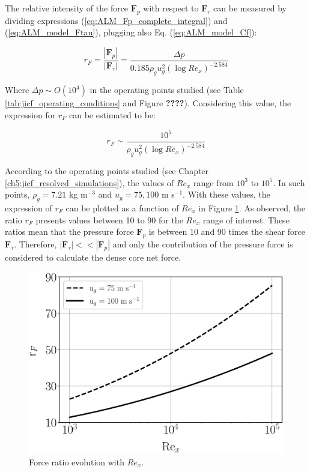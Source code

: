 The relative intensity of the force $\boldsymbol{F}_p$ with respect to $\boldsymbol{F}_\tau$ can be measured by dividing expressions (\ref{eq:ALM_Fp_complete_integral}) and (\ref{eq:ALM_model_Ftau}), plugging also Eq. (\ref{eq:ALM_model_Cf}):

\begin{equation}
\label{eq:rF_definition}
r_F = \frac{| \boldsymbol{F}_p| }{| \boldsymbol{F}_\tau |} = \frac{\Delta p}{0.185 \rho_g u_g^2 \left( \log Re_x \right)^{-2.584}}
\end{equation}


Where $\Delta p \sim O \left( 10^4 \right) $ in the operating points studied (see Table \ref{tab:jicf_operating_conditions} and Figure \textbf{????}). Considering this value, the expression for $r_F$ can be estimated to be:

\begin{equation}
r_F \sim \frac{10^5}{\rho_g u_g^2 \left( \log Re_x \right)^{-2.584}}
\end{equation}

According to the operating points studied (see Chapter \ref{ch5:jicf_resolved_simulations}), the values of $Re_x$ range from $10^3$ to $10^5$. In such points, $\rho_g = 7.21$ kg m$^{-3}$ and $u_g = 75, 100$ m s$^{-1}$. With these values, the expression of $r_F$ can be plotted as a function of $Re_x$ in Figure \ref{fig:ALM_rF_vs_Rex}. As observed, the ratio $r_F$ presents values between 10 to 90 for the $Re_x$ range of interest. These ratios mean that the pressure force $\boldsymbol{F}_p$ is between 10 and 90 times the shear force $\boldsymbol{F}_\tau$. Therefore, $|\boldsymbol{F}_\tau| << |\boldsymbol{F}_p|$ and only the contribution of the pressure force is considered to calculate the dense core net force.




\begin{figure}[h!]
	\centering
	\includegraphics[scale=0.5]{./part2_developments/figures_ch4_SLI/ALM_rF_vs_Rex.eps}
	\caption{Force ratio evolution with $Re_x$.}
	\label{fig:ALM_rF_vs_Rex}
\end{figure}


